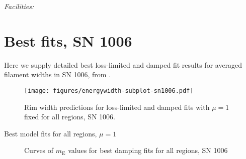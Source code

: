 \documentclass[iop, apj, numberedappendix]{emulateapj}
\newcommand*{\mt}{\mathrm}
\newcommand*{\mE}{m_\mt{E}}
\begin{document}
{\it Facilities:} 

\appendix

\setcounter{table}{0}
\renewcommand{\thetable}{A\arabic{table}}
\setcounter{figure}{0}
\renewcommand{\thefigure}{A\arabic{figure}}

%
%    

\section{Best fits, SN 1006}

Here we supply detailed best loss-limited and damped fit results for averaged
filament widths in SN 1006, from \citet{ressler2014}.

\begin{figure*}[h]
    \centering
    \texttt{[image: figures/energywidth-subplot-sn1006.pdf]}
    \caption{Rim width predictions for loss-limited and damped fits with
    $\mu = 1$ fixed for all regions, SN 1006.}
\end{figure*}

\begin{table}[h]
    \footnotesize
    \centering
    \caption{Best model fits for all regions, $\mu = 1$}
    
\end{table}

\begin{figure}
    \centering
    \iftoggle{manuscript}{
        \texttt{[image: figures/mE-damp-sn1006.pdf]}
    }{
        \texttt{[image: figures/mE-damp-sn1006.pdf]}
    }
    \caption{Curves of $\mE$ values for best damping fits for all regions,
        SN 1006}
\end{figure}
\end{document}
